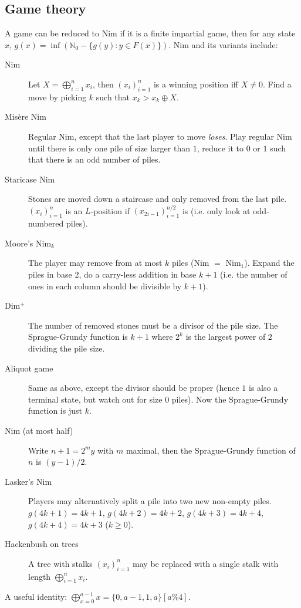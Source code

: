 \documentclass[
	a4paper,
	landscape,
	10pt,
	article
]{article}
\begin{document}
\subsection{Game theory}
A game can be reduced to Nim if it is a finite impartial game, then for any
state $x$, $g(x) = \inf (\mathbb{N}_0 - \{g(y) : y \in F(x) \})$. Nim and
its variants include:
\begin{description}
	\item[Nim] Let $X = \bigoplus_{i=1}^n x_i$, then $(x_i)_{i=1}^n$ is a
		winning position iff $X\neq 0$. Find a move by picking $k$ such
		that $x_k > x_k \oplus X$.
    \item[Misère Nim] Regular Nim, except that the last player to move
		\textit{loses}. Play regular Nim until there is only one pile of size
		larger than $1$, reduce it to $0$ or $1$ such that there is an odd
		number of piles.
    \item[Staricase Nim] Stones are moved down a staircase and only removed
		from the last pile. $(x_i)_{i=1}^n$ is an $L$-position if 
		$(x_{2i-1})_{i=1}^{n/2}$ is (i.e. only look at odd-numbered piles).
    \item[Moore's Nim$_k$] The player may remove from at most $k$ piles
		(Nim $=$ Nim$_1$). Expand the piles in base $2$, do a carry-less
		addition in base $k+1$ (i.e. the number of ones in each column
		should be divisible by $k+1$).
    \item[Dim$^+$] The number of removed stones must be a divisor of the
		pile size. The Sprague-Grundy function is $k+1$ where $2^k$ is the
		largest power of $2$ dividing the pile size.
    \item[Aliquot game] Same as above, except the divisor should be proper
		(hence $1$ is also a terminal state, but watch out for size $0$ piles).
		Now the Sprague-Grundy function is just $k$.
    \item[Nim (at most half)] Write $n+1 = 2^my$ with $m$ maximal, then the
		Sprague-Grundy function of $n$ is $(y - 1) / 2$.
    \item[Lasker's Nim] Players may alternatively split a pile into two new
		non-empty piles. $g(4k+1) = 4k+1$, $g(4k+2) = 4k+2$, $g(4k+3) = 4k+4$,
		$g(4k+4) = 4k+3$ ($k\geq 0$).
    \item[Hackenbush on trees] A tree with stalks $(x_i)_{i=1}^n$ may be
		replaced with a single stalk with length $\bigoplus_{i=1}^n x_i$.
\end{description}
A useful identity: $\bigoplus_{x=0}^{a - 1} x = \{0, a - 1, 1, a\}[a \% 4]$.
\end{document}
